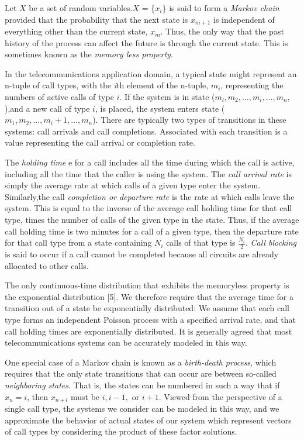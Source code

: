 \documentclass[journal, twoside]{IEEEtran}
\begin{document}
Let \(X\) be a set of random variables.\(X\) = \{\(x_i\)\}  is said to form a \textit{Markov chain}  provided that the probability that the next state
is \(x_{m+1}\) is independent of everything other than the current
state, \(x_m\). Thus, the only way that the past history of the process
can affect the future is through the current state. This is sometimes known as the \textit{memory less property}.

In the telecommunications application domain, a typical
state might represent an n-tuple of call types, with the \textit{i}th element of the n-tuple, \(m_i\),  representing the numbers of active
calls of type \(i\). If the system is in state (\(m_l, m_2, ..., m_i, ..., m_n,\)),and a new call of type \(i\), is placed, the system enters state (\(m_1, m_2, ...,m_i+1, ..., m_n\)). There are typically two types of transitions in these systems: call arrivals and call completions. Associated with each transition is a value representing the call
arrival or completion rate.

The \textit{holding time} e for a call includes all the time during
which the call is active, including all the time that the caller is
using the system. The \textit{call arrival rate }is simply the average rate at which calls of a given type enter the system. Similarly,the call \textit{completion or departure rate} is the rate at which calls leave the system. This is equal to the inverse of the average
call holding time for that call type, times the number of calls of the given type in the state. Thus, if the average call holding time is two minutes for a call of a given type, then the departure rate for that call type from a state containing \(N_i\) calls of
that type is \(\frac{N_i}{2}\). \textit{Call blocking} is said to occur if a call cannot be completed because all circuits are already allocated to other calls.

The only continuous-time distribution that exhibits the
memoryless property is the exponential distribution [5]. We
therefore require that the average time for a transition out of a state be exponentially distributed: We assume that each call type forms an independent Poisson process with a specified arrival rate, and that call holding times are exponentially distributed. It is generally agreed that most telecommunications systems can be accurately modeled in this way.

One special case of a Markov chain is known as a \textit{birth-death process}, which requires that the only state transitions
that can occur are between so-called \textit{neighboring states}. That
is, the states can be numbered in such a way that if \(x_n = i\), then \(x_{n+l}\) must be \(i, i - 1,\) or \(i + 1.\) Viewed from the perspective of a single call type, the systems we consider can be modeled in this way, and we approximate the behavior of actual states of our system which represent vectors of call types by considering the product of these factor solutions.
\end{document}
